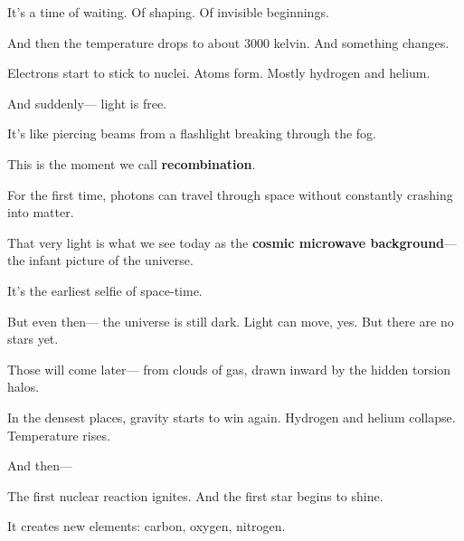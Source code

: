 \documentclass{article}
\begin{document}
\vspace{1ex}
\noindent
It’s a time of waiting.  
Of shaping.  
Of invisible beginnings.

\vspace{1ex}
\noindent
And then the temperature drops to about 3000 kelvin.  
And something changes.

\vspace{1ex}
\noindent
Electrons start to stick to nuclei.  
Atoms form.  
Mostly hydrogen and helium.

\vspace{1ex}
\noindent
And suddenly—  
light is free.

\vspace{1ex}
\noindent
It’s like piercing beams from a flashlight  
breaking through the fog.

\vspace{1ex}
\noindent
This is the moment we call \textbf{recombination}.

\vspace{1ex}
\noindent
For the first time, photons can travel through space  
without constantly crashing into matter.

\vspace{1ex}
\noindent
That very light is what we see today  
as the \textbf{cosmic microwave background}—  
the infant picture of the universe.

\vspace{1ex}
\noindent
It’s the earliest selfie of space-time.

\vspace{1ex}
\noindent
But even then—  
the universe is still dark.  
Light can move, yes.  
But there are no stars yet.

\vspace{1ex}
\noindent
Those will come later—  
from clouds of gas,  
drawn inward by the hidden torsion halos.

\vspace{1ex}
\noindent
In the densest places,  
gravity starts to win again.  
Hydrogen and helium collapse.  
Temperature rises.

\vspace{1ex}
\noindent
And then—

\vspace{1ex}
\noindent
The first nuclear reaction ignites.  
And the first star begins to shine.

\vspace{1ex}
\noindent
It creates new elements:  
carbon, oxygen, nitrogen.
\end{document}
